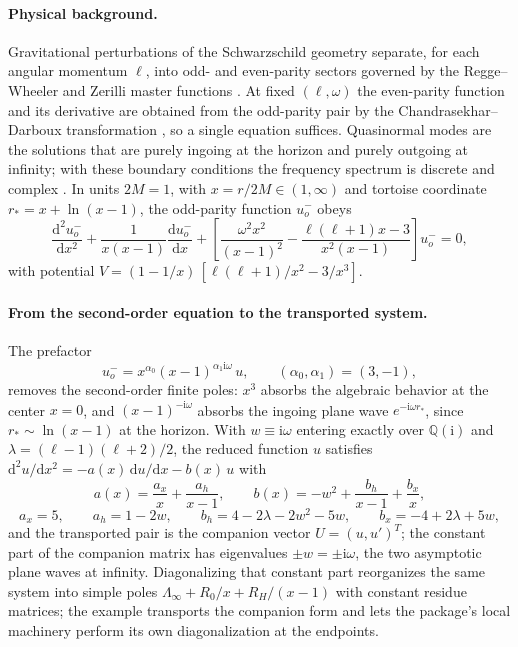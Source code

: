 \documentclass[11pt,a4paper]{article}
\newcommand{\dd}{\mathrm d}
\newcommand{\ii}{\mathrm i}
\begin{document}
\paragraph{Physical background.}
Gravitational perturbations of the Schwarzschild geometry separate, for each angular
momentum $\ell$, into odd- and even-parity sectors governed by the Regge--Wheeler and
Zerilli master functions \cite{Regge:1957td,Zerilli:1970se}. At fixed $(\ell,\omega)$ the
even-parity function and its derivative are obtained from the odd-parity pair by the
Chandrasekhar--Darboux transformation \cite{Glampedakis:2017rar}, so a single equation
suffices. Quasinormal modes are the solutions that are purely ingoing at the horizon and
purely outgoing at infinity; with these boundary conditions the frequency spectrum is
discrete and complex \cite{Leaver:1985ax,Berti:2009kk}. In units
$2M=1$, with $x=r/2M\in(1,\infty)$ and tortoise coordinate $r_{*}=x+\ln(x-1)$, the
odd-parity function $u^{-}_{o}$ obeys
\begin{equation}
  \frac{\dd^{2}u^{-}_{o}}{\dd x^{2}}
  +\frac{1}{x(x-1)}\frac{\dd u^{-}_{o}}{\dd x}
  +\left[\frac{\omega^{2}x^{2}}{(x-1)^{2}}
  -\frac{\ell(\ell+1)x-3}{x^{2}(x-1)}\right]u^{-}_{o}=0,
  \label{eq:qnm-original-rw}
\end{equation}
with potential $V=(1-1/x)\,[\ell(\ell+1)/x^{2}-3/x^{3}]$.

\paragraph{From the second-order equation to the transported system.}
The prefactor
\begin{equation}
  u^{-}_{o}=x^{\alpha_0}(x-1)^{\alpha_1\ii\omega}\,u,
  \qquad(\alpha_0,\alpha_1)=(3,-1),
  \label{eq:qnm-u-transform}
\end{equation}
removes the second-order finite poles: $x^{3}$ absorbs the algebraic behavior at the
center $x=0$, and $(x-1)^{-\ii\omega}$ absorbs the ingoing plane wave
$e^{-\ii\omega r_{*}}$, since $r_{*}\sim\ln(x-1)$ at the horizon. With
$w\equiv\ii\omega$ entering exactly over $\mathbb Q(\ii)$ and
$\lambda=(\ell-1)(\ell+2)/2$, the reduced function $u$ satisfies
$\dd^{2}u/\dd x^{2}=-a(x)\,\dd u/\dd x-b(x)\,u$ with
\begin{equation}
  a(x)=\frac{a_x}{x}+\frac{a_h}{x-1},
  \qquad
  b(x)=-w^{2}+\frac{b_h}{x-1}+\frac{b_x}{x},
  \label{eq:qnm-companion-coefficients}
\end{equation}
\begin{equation}
  a_x=5,\qquad a_h=1-2w,\qquad b_h=4-2\lambda-2w^{2}-5w,\qquad
  b_x=-4+2\lambda+5w,
\end{equation}
and the transported pair is the companion vector $U=(u,u')^{T}$; the constant part of the
companion matrix has eigenvalues $\pm w=\pm\ii\omega$, the two asymptotic plane waves at
infinity. Diagonalizing that constant part reorganizes the same system into simple poles
$\Lambda_{\infty}+R_{0}/x+R_{H}/(x-1)$ with constant residue matrices; the example
transports the companion form and lets the package's local machinery perform its own
diagonalization at the endpoints.
\end{document}
